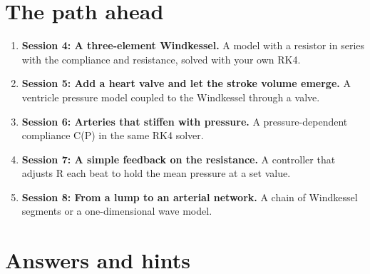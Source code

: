 \documentclass[11pt,a4paper]{article}
\begin{document}
\section{The path ahead}
\begin{enumerate}[nosep]
\item \textbf{Session 4: A three-element Windkessel.} A model with a resistor in series with the compliance and resistance, solved with your own RK4.
\item \textbf{Session 5: Add a heart valve and let the stroke volume emerge.} A ventricle pressure model coupled to the Windkessel through a valve.
\item \textbf{Session 6: Arteries that stiffen with pressure.} A pressure-dependent compliance C(P) in the same RK4 solver.
\item \textbf{Session 7: A simple feedback on the resistance.} A controller that adjusts R each beat to hold the mean pressure at a set value.
\item \textbf{Session 8: From a lump to an arterial network.} A chain of Windkessel segments or a one-dimensional wave model.
\end{enumerate}

\section{Answers and hints}
\end{document}
